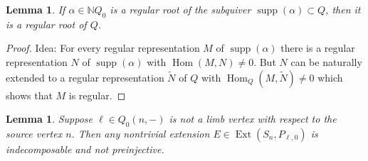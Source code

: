\documentclass{amsart}
\newtheorem{lemma}[theorem]{Lemma}
\numberwithin{equation}{section}
\newcommand{\NN}{\mathbb{N}}
\newcommand{\Ext}{\operatorname{Ext}}
\newcommand{\Hom}{\operatorname{Hom}}
\newcommand{\supp}{\operatorname{supp}}
\begin{document}
\begin{lemma}
  \label{lem:regular support}
  If $\alpha\in\NN Q_0$ is a regular root of the subquiver $\supp(\alpha)\subset Q$, then it is a regular root of $Q$.
\end{lemma}
\begin{proof}Idea: For every regular representation $M$ of $\supp(\alpha)$ there is a regular representation $N$ of $\supp(\alpha)$ with $\Hom(M,N)\neq 0$. But $N$ can be naturally extended to a regular representation $\tilde N$ of $Q$ with $\Hom_Q(M,\tilde N)\neq 0$ which shows that $M$ is regular.
\end{proof}

\begin{lemma}
  \label{le:nonlimb extensions}
  Suppose $\ell\in Q_0(n,-)$ is not a limb vertex with respect to the source vertex $n$.
  Then any nontrivial extension $E\in\Ext(S_n,P_{\ell,0})$ is indecomposable and not preinjective.
\end{lemma}
\end{document}
